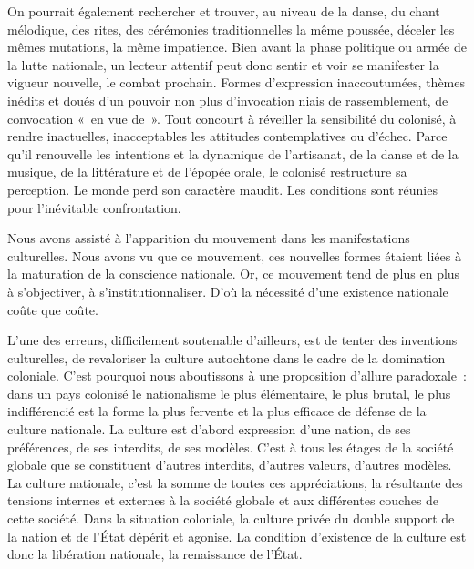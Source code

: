 \documentclass[french,twoside]{book} %
\begin{document}
\bigbreak
\noindent On pourrait également rechercher et trouver, au niveau de la danse, du chant mélodique, des rites, des cérémonies traditionnelles la même poussée, déceler les mêmes mutations, la même impatience. Bien avant la phase politique ou armée de la lutte nationale, un lecteur attentif peut donc sentir et voir se manifester la vigueur nouvelle, le combat prochain. Formes d’expression inaccoutumées, thèmes inédits et doués d’un pouvoir non plus d’invocation niais de rassemblement, de convocation « en vue de ». Tout concourt à réveiller la sensibilité du colonisé, à rendre inactuelles, inacceptables les attitudes contemplatives ou d’échec. Parce qu’il renouvelle les intentions et la dynamique de l’artisanat, de la danse et de la musique, de la littérature et de l’épopée orale, le colonisé restructure sa perception. Le monde   perd son caractère maudit. Les conditions sont réunies pour l’inévitable confrontation.\par
\bigbreak
\noindent Nous avons assisté à l’apparition du mouvement dans les manifestations culturelles. Nous avons vu que ce mouvement, ces nouvelles formes étaient liées à la maturation de la conscience nationale. Or, ce mouvement tend de plus en plus à s’objectiver, à s’institutionnaliser. D’où la nécessité d’une existence nationale coûte que coûte.\par
\bigbreak
\noindent L’une des erreurs, difficilement soutenable d’ailleurs, est de tenter des inventions culturelles, de revaloriser la culture autochtone dans le cadre de la domination coloniale. C’est pourquoi nous aboutissons à une proposition d’allure paradoxale : dans un pays colonisé le nationalisme le plus élémentaire, le plus brutal, le plus indifférencié est la forme la plus fervente et la plus efficace de défense de la culture nationale. La culture est d’abord expression d’une nation, de ses préférences, de ses interdits, de ses modèles. C’est à tous les étages de la société globale que se constituent d’autres interdits, d’autres valeurs, d’autres modèles. La culture nationale, c’est la somme de toutes ces appréciations, la résultante des tensions internes et externes à la société globale et aux différentes couches de cette société. Dans la situation coloniale, la culture privée du double support de la nation et de l’État dépérit et agonise. La condition d’existence de la culture est donc la libération nationale, la renaissance de l’État.\par
\bigbreak
\end{document}
